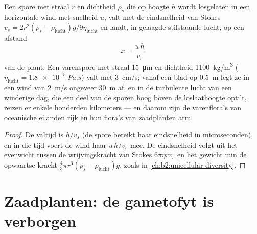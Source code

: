 \begin{theorem}\label{thm:b2:plant-life-cycles:dispersal}
Een spore met straal $r$ en dichtheid $\rho_s$ die op hoogte $h$ wordt
losgelaten in een horizontale wind met snelheid $u$, valt met de
eindsnelheid van Stokes
$v_s = 2r^2(\rho_s - \rho_{\text{lucht}})g/9\eta_{\text{lucht}}$
en landt, in gelaagde stilstaande lucht, op een afstand
\[
x = \frac{u\,h}{v_s}
\]
van de plant. Een varenspore met straal \qty{15}{\micro m} en
dichtheid \qty{1100}{kg/m^3} ($\eta_{\text{lucht}} = \qty{1.8e-5}{Pa.s}$)
valt met \qty{3}{cm/s}; vanaf een blad op \qty{0.5}{m} legt ze in een
wind van \qty{2}{m/s} ongeveer \qty{30}{m} af, en in de turbulente lucht
van een winderige dag, die een deel van de sporen hoog boven de
loslaathoogte optilt, reizen er enkele honderden kilometers --- en daarom
zijn de varenflora's van oceanische eilanden rijk en hun flora's van
zaadplanten arm.
\end{theorem}
\begin{proof}
De valtijd is $h/v_s$ (de spore bereikt haar eindsnelheid in
microseconden), en in die tijd voert de wind haar $u\,h/v_s$ mee. De
eindsnelheid volgt uit het evenwicht tussen de wrijvingskracht van Stokes $6\pi\eta r
v_s$ en het gewicht min de opwaartse kracht $\tfrac43\pi r^3(\rho_s -
\rho_{\text{lucht}})g$, zoals in \cref{ch:b2:unicellular-diversity}.
\end{proof}

\section{Zaadplanten: de gametofyt is verborgen}

